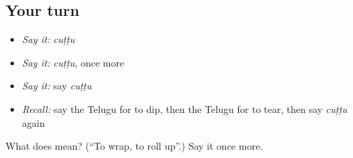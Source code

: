 \subsection*{Your turn}
\begin{itemize}
\raggedright
  \item \emph{Say it:} \emph{cuṭṭu}
  \item \emph{Say it:} \emph{cuṭṭu}, once more
  \item \emph{Say it:} say \emph{cuṭṭu}
  \item \emph{Recall:} say the Telugu for to dip, then the Telugu for to tear, then say \emph{cuṭṭu} again
\end{itemize}

\begin{tcolorbox}[breakable,colback=teal!4,colframe=teal!35!black,title={Before you move on}]
What does  mean? (\textquotedblleft{}To wrap, to roll up\textquotedblright{}.) Say it once more.
\end{tcolorbox}
